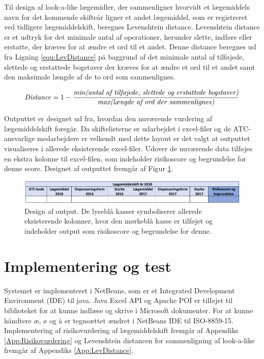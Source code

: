 Til design af look-a-like lægemidler, der sammenligner hvorvidt et lægemiddels navn for det kommende skifteår ligner et andet lægemiddel, som er registreret ved tidligere lægemiddelskift, beregnes Levenshtein distance. Levenshtein distance er et udtryk for det minimale antal af operationer, herunder slette, indføre eller erstatte, der kræves for at ændre et ord til et andet. Denne distance beregnes ud fra Ligning \ref{equ:LevDistance} på baggrund af det minimale antal af tilføjede, slettede og erstattede bogstaver der kræves for at ændre et ord til et andet samt den maksimale længde af de to ord som sammenlignes. 

\begin{equation} \label{equ:LevDistance}
\mbox{\textit{Distance}} = 1 - \frac{\mbox{\textit{min(antal af tilføjede, slettede og erstattede bogstaver)}}}{\mbox{\textit{max(længde af ord der sammenlignes)}}}   
\end{equation}

Outputtet er designet ud fra, hvordan den nuværende vurdering af lægemiddelskift foregår. Da skiftelisterne er udarbejdet i excel-filer og de ATC-ansvarlige medarbejdere er velkendt med dette layout er det valgt at outputtet visualiseres i allerede eksisterende excel-filer. Udover de nuværende data tilføjes en ekstra kolonne til excel-filen, som indeholder risikoscore og begrundelse for denne score. Designet af outputtet fremgår af Figur \ref{fig:Output}.

\begin{figure}[H]\centering
\includegraphics[width=1\textwidth]{billeder/Output.png} 
	\caption{Design af output. De lyseblå kasser symboliserer allerede eksisterende kolonner, hvor den mørkeblå kasse er tilføjet og indeholder output som risikoscore og begrundelse for denne.}
	\label{fig:Output}  
\end{figure}

\newpage
\section{Implementering og test}
Systemet er implementeret i NetBeans, som er et Integrated Development Environment (IDE) til java.  Java Excel API og Apache POI er tilføjet til biblioteket for at kunne indlæse og skrive i Microsoft dokumenter. For at kunne håndtere æ, ø og å er tegnsættet ændret i NetBeans IDE til ISO-8859-15. Implementering af risikovurdering af lægemiddelskift fremgår af Appendiks \ref{App:Risikovurdering} og Levenshtein distancen for sammenligning af look-a-like fremgår af Appendiks \ref{App:LevDistance}.

